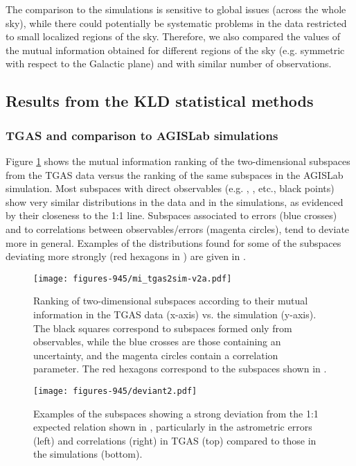 The comparison to the simulations is sensitive to global issues
(across the whole sky), while there could potentially be systematic
problems in the data restricted to small localized regions of the
sky. Therefore, we also compared the values of the mutual information
obtained for different regions of the sky (e.g. symmetric with respect
to the Galactic plane) and with similar number of observations.

\subsection{Results from the KLD statistical methods}\label{sec:res_stat}

\subsubsection{TGAS and comparison to AGISLab simulations}

Figure \ref{fig:rank_wp945} shows the mutual information ranking of
the two-dimensional subspaces from the TGAS data versus the ranking of
the same subspaces in the AGISLab simulation. Most subspaces with
direct observables (e.g. , , etc., black points) show
very similar distributions in the data and in the simulations, as
evidenced by their closeness to the 1:1 line.  Subspaces associated to
errors (blue crosses) and to correlations between observables/errors
(magenta circles), tend to deviate more in general. Examples of the
distributions found for some of the subspaces deviating more strongly
(red hexagons in ) are given in
.

\begin{figure}
\begin{center}
\texttt{[image: figures-945/mi\_tgas2sim-v2a.pdf]}
\caption{Ranking of two-dimensional subspaces according to their mutual
information in the TGAS data (x-axis) vs. the simulation (y-axis). The black squares correspond to subspaces formed only from observables, while the blue crosses are those containing an uncertainty, and the 
magenta circles contain a correlation parameter. The red hexagons correspond to the subspaces shown in .
}\label{fig:rank_wp945}
\end{center}
\end{figure}

\begin{figure}
\begin{center}
\texttt{[image: figures-945/deviant2.pdf]}
\caption{Examples of the subspaces showing a strong deviation from the 1:1 expected relation shown in , particularly in the astrometric errors (left) and correlations (right) in TGAS (top) compared to those in the simulations (bottom).}\label{fig:subspace-sims-example}
\end{center}
\end{figure}

